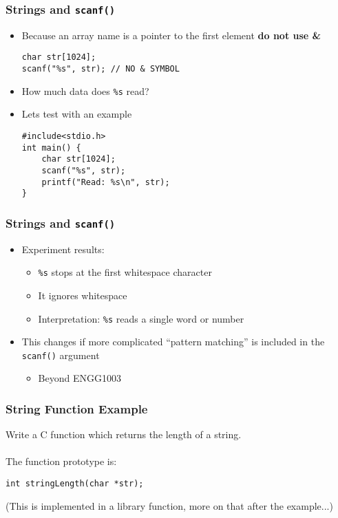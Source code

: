 \documentclass[14pt]{beamer}
\begin{document}
\begin{frame}[fragile]
\frametitle{Strings and \texttt{scanf()}}
\begin{itemize}
\item Because an array name is a pointer to the first element \textbf{do not use \&}
\begin{lstlisting}[style=CStyle]
char str[1024];
scanf("%s", str); // NO & SYMBOL
\end{lstlisting}
\pause
\item How much data does \texttt{\%s} read?
\pause
\item Lets test with an example
\begin{lstlisting}[style=CStyle]
#include<stdio.h> 
int main() { 
    char str[1024]; 
    scanf("%s", str); 
    printf("Read: %s\n", str); 
}
\end{lstlisting}
\end{itemize}
\end{frame}

\begin{frame}
\frametitle{Strings and \texttt{scanf()}}
\begin{itemize}
\item Experiment results:
	\begin{itemize}
		\item \texttt{\%s} stops at the first whitespace character
		\item It ignores  whitespace
		\item Interpretation: \texttt{\%s} reads a single word or number
	\end{itemize}
\item This changes if more complicated ``pattern matching'' is included in the \texttt{scanf()} argument
	\begin{itemize}
		\item Beyond ENGG1003
	\end{itemize}
\end{itemize}
\end{frame}

\begin{frame}[fragile]
\frametitle{String Function Example}
Write a C function which returns the length of a string.
\\~\\
The function prototype is:

\begin{lstlisting}[style=CStyle]
int stringLength(char *str);
\end{lstlisting}
(This is implemented in a library function, more on that after the example...)
\end{frame}
\end{document}
